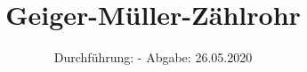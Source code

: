

\subject{V703}
\title{Geiger-Müller-Zählrohr}
\date{%
  Durchführung: -
  \hspace{3em}
  Abgabe: 26.05.2020
}



\maketitle
\thispagestyle{empty}
\tableofcontents
\newpage







\printbibliography{}


